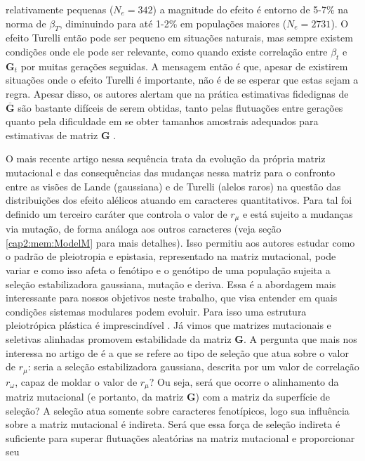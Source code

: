 relativamente pequenas ($N_e=342$) a magnitude do efeito é entorno de
5-7\% na norma de $\beta_T$, diminuindo para até 1-2\% em populações
maiores ($N_e=2731$).
O efeito Turelli então pode ser pequeno em situações naturais, mas
sempre existem condições onde ele pode ser relevante, como quando existe
correlação entre $\beta_t$ e $\mathbf{G}_t$ por muitas gerações seguidas.
A mensagem então é que, apesar de existirem situações onde o efeito
Turelli é importante, não é de se esperar que estas sejam a regra.
Apesar disso, os autores alertam que na prática estimativas fidedignas
de $\overline {\mathbf{G}}$ são bastante difíceis de serem obtidas, tanto pelas
flutuações entre gerações quanto pela dificuldade em se obter tamanhos
amostrais adequados para estimativas de matriz $\mathbf{G}$ \citep{Marroig2011b}.

O mais recente artigo nessa sequência \citep{Jones2007} trata da
evolução da própria matriz mutacional e das consequências das mudanças
nessa matriz para o confronto entre as visões de Lande (gaussiana) e de
Turelli (alelos raros) na questão das distribuições dos efeito alélicos
atuando em caracteres quantitativos.
Para tal foi definido um terceiro caráter que controla o valor de
$r_\mu$ e está sujeito a mudanças via mutação, de forma análoga aos
outros caracteres (veja seção \ref{cap2:mem:ModelM} para mais detalhes).
Isso permitiu aos autores estudar como o padrão de pleiotropia e
epistasia, representado na matriz mutacional, pode variar e como isso
afeta o fenótipo e o genótipo de uma população sujeita a seleção
estabilizadora gaussiana, mutação e deriva.
Essa é a abordagem mais interessante para nossos objetivos neste
trabalho, que visa entender em quais condições sistemas modulares podem
evoluir.
Para isso uma estrutura pleiotrópica plástica é imprescindível
\citep{Wagner1996, Pavlicev2011a}.
Já vimos que matrizes mutacionais e seletivas alinhadas promovem
estabilidade da matriz $\mathbf{G}$.
A pergunta que mais nos interessa no artigo de \cite{Jones2007} é a que
se refere ao tipo de seleção que atua sobre o valor de $r_\mu$: seria a
seleção estabilizadora gaussiana, descrita por um valor de correlação
$r_\omega$, capaz de moldar o valor de $r_\mu$? 
Ou seja, será que ocorre o alinhamento da matriz mutacional (e portanto,
da matriz $\mathbf{G}$)  com a matriz da superfície de seleção? 
A seleção atua somente sobre caracteres fenotípicos, logo sua influência
sobre a matriz mutacional é indireta.
Será que essa força de seleção indireta é suficiente para superar
flutuações aleatórias na matriz mutacional e proporcionar seu
